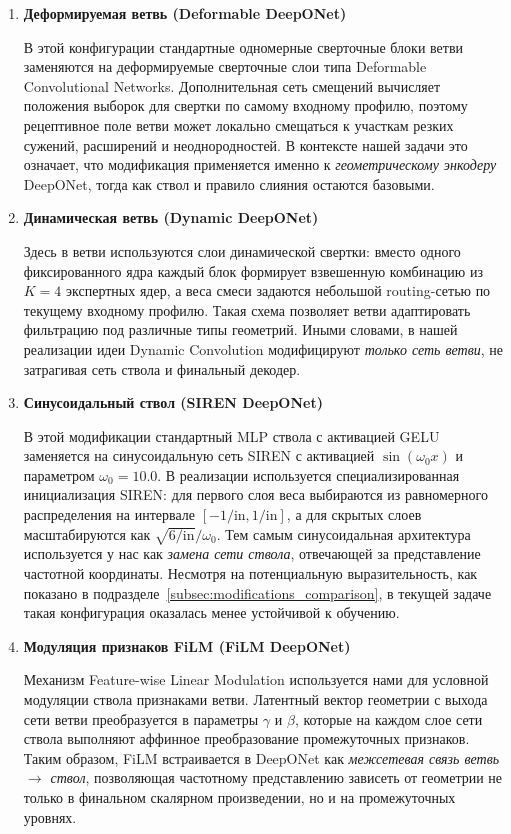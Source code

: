\begin{enumerate}
    \item \textbf{Деформируемая ветвь (Deformable DeepONet)}~\cite{dai2017deformable}
    
    В этой конфигурации стандартные одномерные сверточные блоки ветви заменяются на деформируемые сверточные слои типа Deformable Convolutional Networks. Дополнительная сеть смещений вычисляет положения выборок для свертки по самому входному профилю, поэтому рецептивное поле ветви может локально смещаться к участкам резких сужений, расширений и неоднородностей. В контексте нашей задачи это означает, что модификация применяется именно к \emph{геометрическому энкодеру} DeepONet, тогда как ствол и правило слияния остаются базовыми.
    
    \item \textbf{Динамическая ветвь (Dynamic DeepONet)}~\cite{chen2020dynamic}
    
    Здесь в ветви используются слои динамической свертки: вместо одного фиксированного ядра каждый блок формирует взвешенную комбинацию из $K=4$ экспертных ядер, а веса смеси задаются небольшой routing-сетью по текущему входному профилю. Такая схема позволяет ветви адаптировать фильтрацию под различные типы геометрий. Иными словами, в нашей реализации идеи Dynamic Convolution модифицируют \emph{только сеть ветви}, не затрагивая сеть ствола и финальный декодер.
    
    \item \textbf{Синусоидальный ствол (SIREN DeepONet)}~\cite{sitzmann2020siren}
    
    В этой модификации стандартный MLP ствола с активацией GELU заменяется на синусоидальную сеть SIREN с активацией $\sin(\omega_0 x)$ и параметром $\omega_0 = 10.0$. В реализации используется специализированная инициализация SIREN: для первого слоя веса выбираются из равномерного распределения на интервале $[-1/\text{in}, 1/\text{in}]$, а для скрытых слоев масштабируются как $\sqrt{6/\text{in}}/\omega_0$. Тем самым синусоидальная архитектура используется у нас как \emph{замена сети ствола}, отвечающей за представление частотной координаты. Несмотря на потенциальную выразительность, как показано в подразделе~\ref{subsec:modifications_comparison}, в текущей задаче такая конфигурация оказалась менее устойчивой к обучению.
    
    \item \textbf{Модуляция признаков FiLM (FiLM DeepONet)}~\cite{perez2018film}
    
    Механизм Feature-wise Linear Modulation используется нами для условной модуляции ствола признаками ветви. Латентный вектор геометрии с выхода сети ветви преобразуется в параметры $\gamma$ и $\beta$, которые на каждом слое сети ствола выполняют аффинное преобразование промежуточных признаков. Таким образом, FiLM встраивается в DeepONet как \emph{межсетевая связь ветвь $\rightarrow$ ствол}, позволяющая частотному представлению зависеть от геометрии не только в финальном скалярном произведении, но и на промежуточных уровнях.
    

\end{enumerate}
